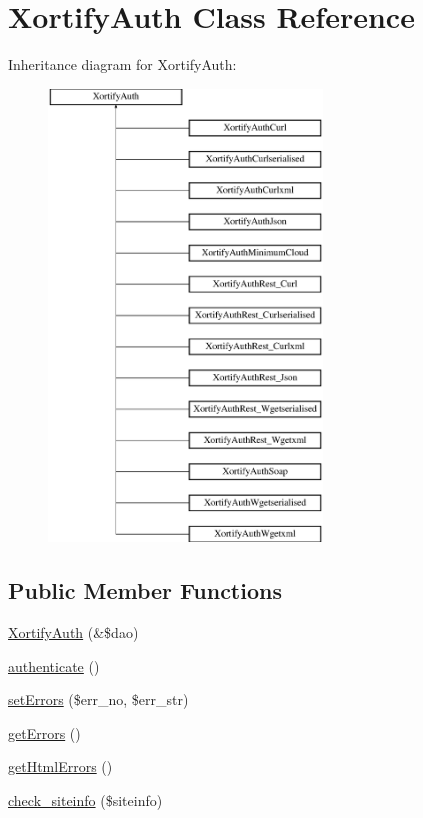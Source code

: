 \hypertarget{class_xortify_auth}{\section{Xortify\-Auth Class Reference}
\label{class_xortify_auth}
}
Inheritance diagram for Xortify\-Auth\-:\begin{figure}[H]
\begin{center}
\leavevmode
\includegraphics[height=12.000000cm]{class_xortify_auth}
\end{center}
\end{figure}
\subsection*{Public Member Functions}
\begin{DoxyCompactItemize}
\item 
\hyperlink{class_xortify_auth_ae455a3d60f2c1784e887d0d5ebc2a68e}{Xortify\-Auth} (\&\$dao)
\item 
\hyperlink{class_xortify_auth_a7319a351e4f2865b4be59e1883be438c}{authenticate} ()
\item 
\hyperlink{class_xortify_auth_ab7b32339fec0d79984fc28f214e66f11}{set\-Errors} (\$err\-\_\-no, \$err\-\_\-str)
\item 
\hyperlink{class_xortify_auth_ac416d91b78577354bbce123399abe01c}{get\-Errors} ()
\item 
\hyperlink{class_xortify_auth_a103967fc7fa0fe8c83f3a18152279b3f}{get\-Html\-Errors} ()
\item 
\hyperlink{class_xortify_auth_a5d7faec1f578879d43dd7ce226057316}{check\-\_\-siteinfo} (\$siteinfo)
\end{DoxyCompactItemize}
